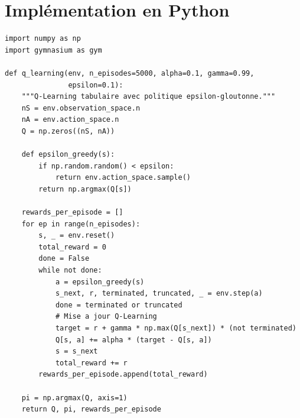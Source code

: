 \section{Impl\'ementation en Python}

\begin{codeblock}[title=\textbf{Q-Learning tabulaire}]
\begin{verbatim}
import numpy as np
import gymnasium as gym

def q_learning(env, n_episodes=5000, alpha=0.1, gamma=0.99,
               epsilon=0.1):
    """Q-Learning tabulaire avec politique epsilon-gloutonne."""
    nS = env.observation_space.n
    nA = env.action_space.n
    Q = np.zeros((nS, nA))

    def epsilon_greedy(s):
        if np.random.random() < epsilon:
            return env.action_space.sample()
        return np.argmax(Q[s])

    rewards_per_episode = []
    for ep in range(n_episodes):
        s, _ = env.reset()
        total_reward = 0
        done = False
        while not done:
            a = epsilon_greedy(s)
            s_next, r, terminated, truncated, _ = env.step(a)
            done = terminated or truncated
            # Mise a jour Q-Learning
            target = r + gamma * np.max(Q[s_next]) * (not terminated)
            Q[s, a] += alpha * (target - Q[s, a])
            s = s_next
            total_reward += r
        rewards_per_episode.append(total_reward)

    pi = np.argmax(Q, axis=1)
    return Q, pi, rewards_per_episode
\end{verbatim}
\end{codeblock}

